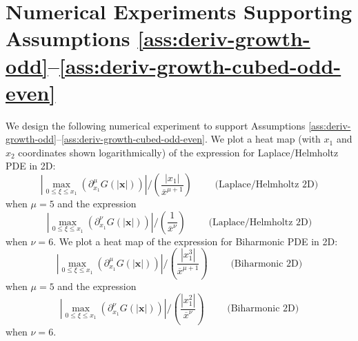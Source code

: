 \documentclass[12pt]{article}
\let\b=\boldsymbol
\theoremstyle{definition}
\theoremstyle{plain}
\theoremstyle{definition}
\begin{document}
\appendix
\section{Numerical Experiments Supporting Assumptions \ref{ass:deriv-growth-odd}--\ref{ass:deriv-growth-cubed-odd-even}}
\label{app:assumption-numerics}


We design the following numerical experiment to support Assumptions \ref{ass:deriv-growth-odd}--\ref{ass:deriv-growth-cubed-odd-even}. We plot a heat map (with $x_1$ and $x_2$ coordinates shown logarithmically) of the expression for Laplace/Helmholtz PDE in 2D:
\begin{equation}
\label{eq:app-laplace-odd}
\left|\max_{0\leq \xi\leq x_1}\left(\partial^{\mu}_{x_1}G(|\b{x}|)\right) \right| / \left(\frac{|x_1|}{\overline{x}^{\mu+1}} \right) \qquad\text{ (Laplace/Helmholtz 2D)}
\end{equation}
when $\mu = 5$ and the expression
\begin{equation}
\label{eq:app-laplace-even}
\left|\max_{0\leq \xi\leq x_1}\left(\partial^{\nu}_{x_1}G(|\b{x}|)\right) \right| / \left(\frac{1}{\overline{x}^{\nu}} \right) \qquad\text{ (Laplace/Helmholtz 2D)}
\end{equation}
when $\nu = 6$. We plot a heat map of the expression for Biharmonic PDE in 2D:
\begin{equation}
\label{eq:app-biharm-odd}
\left|\max_{0\leq \xi\leq x_1}\left(\partial^{\mu}_{x_1}G(|\b{x}|)\right) \right| / \left(\frac{|x_1^3|}{\overline{x}^{\mu+1}} \right) \qquad\text{ (Biharmonic 2D)}
\end{equation}
when $\mu = 5$ and the expression
\begin{equation}
\label{eq:app-biharm-even}
\left|\max_{0\leq \xi\leq x_1}\left(\partial^{\nu}_{x_1}G(|\b{x}|)\right) \right| / \left(\frac{|x_1^2|}{\overline{x}^{\nu}} \right) \qquad\text{ (Biharmonic 2D)}
\end{equation}
when $\nu = 6$.
\end{document}
